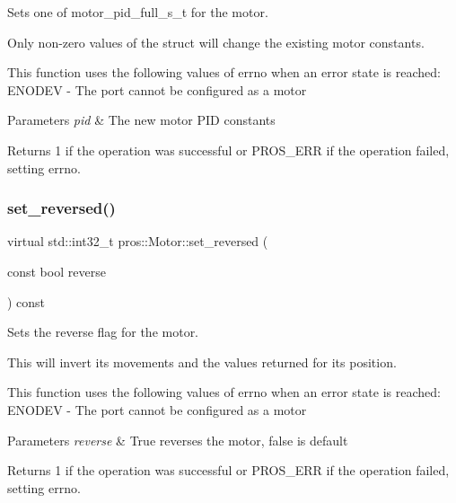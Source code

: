 Sets one of motor\+\_\+pid\+\_\+full\+\_\+s\+\_\+t for the motor. 

Only non-\/zero values of the struct will change the existing motor constants.

This function uses the following values of errno when an error state is reached\+: E\+N\+O\+D\+EV -\/ The port cannot be configured as a motor


\begin{DoxyParams}{Parameters}
{\em pid} & The new motor P\+ID constants\\
\hline
\end{DoxyParams}
\begin{DoxyReturn}{Returns}
1 if the operation was successful or P\+R\+O\+S\+\_\+\+E\+RR if the operation failed, setting errno. 
\end{DoxyReturn}
\mbox{\label{classpros_1_1Motor_a44fcc6447ed1416e880232baa16a221e}} 
\subsubsection{\texorpdfstring{set\+\_\+reversed()}{set\_reversed()}}
{\footnotesize\ttfamily virtual std\+::int32\+\_\+t pros\+::\+Motor\+::set\+\_\+reversed (\begin{DoxyParamCaption}\item[{const bool}]{reverse }\end{DoxyParamCaption}) const\hspace{0.3cm}{\ttfamily [virtual]}}



Sets the reverse flag for the motor. 

This will invert its movements and the values returned for its position.

This function uses the following values of errno when an error state is reached\+: E\+N\+O\+D\+EV -\/ The port cannot be configured as a motor


\begin{DoxyParams}{Parameters}
{\em reverse} & True reverses the motor, false is default\\
\hline
\end{DoxyParams}
\begin{DoxyReturn}{Returns}
1 if the operation was successful or P\+R\+O\+S\+\_\+\+E\+RR if the operation failed, setting errno. 
\end{DoxyReturn}
\mbox{\label{classpros_1_1Motor_a3cd7e4ca0714b533d873796cf8b74a81}} 
